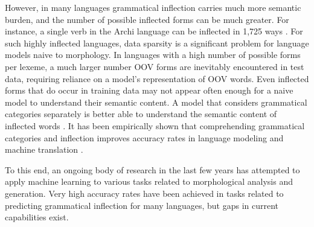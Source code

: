 However, in many languages grammatical inflection carries much more semantic burden, and the number of possible inflected forms can be much greater. For instance, a single verb in the Archi language can be inflected in 1,725 ways \parencite{Kibrik1994}. For such highly inflected languages, data sparsity is a significant problem for language models naive to morphology. In languages with a high number of possible forms per lexeme, a much larger number OOV forms are inevitably encountered in test data, requiring reliance on a model's representation of OOV words. Even inflected forms that do occur in training data may not appear often enough for a naive model to understand their semantic content. A model that considers grammatical categories separately is better able to understand the semantic content of inflected words \parencite{Cotterell2016}. It has been empirically shown that comprehending grammatical categories and inflection improves accuracy rates in language modeling and machine translation \parencite{Faruqui2015}.

To this end, an ongoing body of research in the last few years has attempted to apply machine learning to various tasks related to morphological analysis and generation. Very high accuracy rates have been achieved in tasks related to predicting grammatical inflection for many languages, but gaps in current capabilities exist.